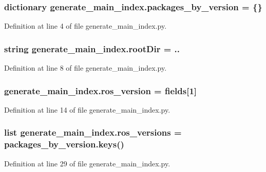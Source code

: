 \subsubsection[{\texorpdfstring{packages\+\_\+by\+\_\+version}{packages_by_version}}]{\setlength{\rightskip}{0pt plus 5cm}dictionary generate\+\_\+main\+\_\+index.\+packages\+\_\+by\+\_\+version = \{\}}\hypertarget{namespacegenerate__main__index_a2ffb2fe092a0f799126e8de4a5b7b27b}{}\label{namespacegenerate__main__index_a2ffb2fe092a0f799126e8de4a5b7b27b}


Definition at line 4 of file generate\+\_\+main\+\_\+index.\+py.

\subsubsection[{\texorpdfstring{root\+Dir}{rootDir}}]{\setlength{\rightskip}{0pt plus 5cm}string generate\+\_\+main\+\_\+index.\+root\+Dir = \textquotesingle{}..\textquotesingle{}}\hypertarget{namespacegenerate__main__index_ac24a79171a155105868ec907224dcf0b}{}\label{namespacegenerate__main__index_ac24a79171a155105868ec907224dcf0b}


Definition at line 8 of file generate\+\_\+main\+\_\+index.\+py.

\subsubsection[{\texorpdfstring{ros\+\_\+version}{ros_version}}]{\setlength{\rightskip}{0pt plus 5cm}generate\+\_\+main\+\_\+index.\+ros\+\_\+version = {\bf fields}\mbox{[}1\mbox{]}}\hypertarget{namespacegenerate__main__index_af86b04596a38d3282cd704e560fe5bfc}{}\label{namespacegenerate__main__index_af86b04596a38d3282cd704e560fe5bfc}


Definition at line 14 of file generate\+\_\+main\+\_\+index.\+py.

\subsubsection[{\texorpdfstring{ros\+\_\+versions}{ros_versions}}]{\setlength{\rightskip}{0pt plus 5cm}list generate\+\_\+main\+\_\+index.\+ros\+\_\+versions = packages\+\_\+by\+\_\+version.\+keys()}\hypertarget{namespacegenerate__main__index_abda9b1c65748837fa9525c5cbb46292c}{}\label{namespacegenerate__main__index_abda9b1c65748837fa9525c5cbb46292c}


Definition at line 29 of file generate\+\_\+main\+\_\+index.\+py.

